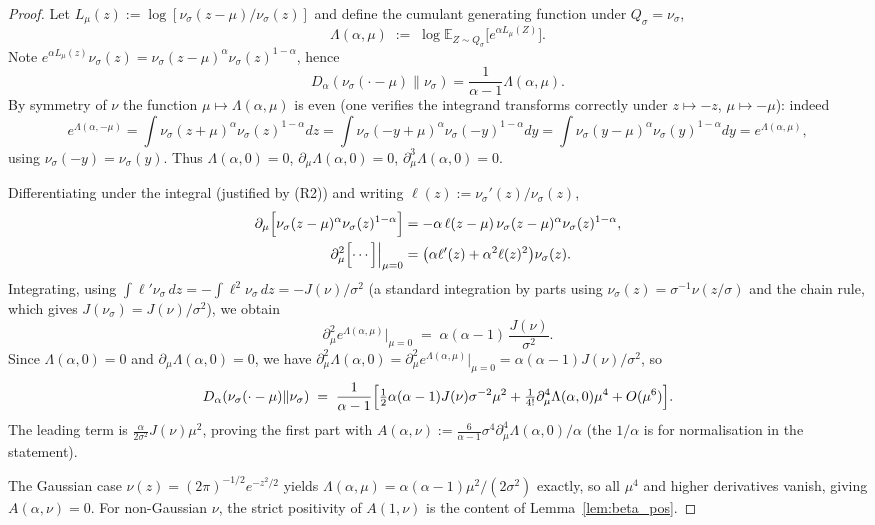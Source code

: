 \documentclass[11pt]{article}
\theoremstyle{definition}
\newcommand{\E}{\mathbb{E}}
\begin{document}
\begin{proof}
Let $L_\mu(z):=\log[\nu_\sigma(z-\mu)/\nu_\sigma(z)]$ and define the cumulant generating function under $Q_\sigma=\nu_\sigma$,
\[
\Lambda(\alpha,\mu)\;:=\;\log \E_{Z\sim Q_\sigma}\bigl[e^{\alpha L_\mu(Z)}\bigr].
\]
Note $e^{\alpha L_\mu(z)}\nu_\sigma(z)=\nu_\sigma(z-\mu)^\alpha\nu_\sigma(z)^{1-\alpha}$, hence
\[
D_\alpha(\nu_\sigma(\cdot-\mu)\|\nu_\sigma)=\frac{1}{\alpha-1}\Lambda(\alpha,\mu).
\]
By symmetry of $\nu$ the function $\mu\mapsto \Lambda(\alpha,\mu)$ is even (one verifies the integrand transforms correctly under $z\mapsto -z$, $\mu\mapsto -\mu$): indeed
\[
e^{\Lambda(\alpha,-\mu)}=\!\int\!\nu_\sigma(z+\mu)^\alpha\nu_\sigma(z)^{1-\alpha}dz=\!\int\!\nu_\sigma(-y+\mu)^\alpha\nu_\sigma(-y)^{1-\alpha}dy=\!\int\!\nu_\sigma(y-\mu)^\alpha\nu_\sigma(y)^{1-\alpha}dy=e^{\Lambda(\alpha,\mu)},
\]
using $\nu_\sigma(-y)=\nu_\sigma(y)$. Thus $\Lambda(\alpha,0)=0$, $\partial_\mu\Lambda(\alpha,0)=0$, $\partial_\mu^3\Lambda(\alpha,0)=0$.

Differentiating under the integral (justified by (R2)) and writing $\ell(z):=\nu_\sigma'(z)/\nu_\sigma(z)$,
\begin{align*}
\partial_\mu\Bigl[\nu_\sigma(z-\mu)^\alpha\nu_\sigma(z)^{1-\alpha}\Bigr]&=-\alpha\,\ell(z-\mu)\,\nu_\sigma(z-\mu)^\alpha\nu_\sigma(z)^{1-\alpha},\\
\partial_\mu^2\Bigl[\cdots\Bigr]\Big|_{\mu=0}&=\bigl(\alpha\ell'(z)+\alpha^2\ell(z)^2\bigr)\nu_\sigma(z).
\end{align*}
Integrating, using $\int\ell'\nu_\sigma\,dz=-\int\ell^2\nu_\sigma\,dz=-J(\nu)/\sigma^2$ (a standard integration by parts using $\nu_\sigma(z)=\sigma^{-1}\nu(z/\sigma)$ and the chain rule, which gives $J(\nu_\sigma)=J(\nu)/\sigma^2$), we obtain
\[
\partial_\mu^2 e^{\Lambda(\alpha,\mu)}\big|_{\mu=0}\;=\;\alpha(\alpha-1)\,\frac{J(\nu)}{\sigma^2}.
\]
Since $\Lambda(\alpha,0)=0$ and $\partial_\mu\Lambda(\alpha,0)=0$, we have $\partial_\mu^2\Lambda(\alpha,0)=\partial_\mu^2 e^{\Lambda(\alpha,\mu)}|_{\mu=0}=\alpha(\alpha-1)J(\nu)/\sigma^2$, so
\[
D_\alpha(\nu_\sigma(\cdot-\mu)\|\nu_\sigma)\;=\;\frac{1}{\alpha-1}\Bigl[\tfrac12\alpha(\alpha-1)J(\nu)\sigma^{-2}\mu^2+\tfrac{1}{4!}\partial_\mu^4\Lambda(\alpha,0)\mu^4+O(\mu^6)\Bigr].
\]
The leading term is $\frac{\alpha}{2\sigma^2}J(\nu)\mu^2$, proving the first part with $A(\alpha,\nu):=\frac{6}{\alpha-1}\sigma^4\partial_\mu^4\Lambda(\alpha,0)/\alpha$ (the $1/\alpha$ is for normalisation in the statement).

The Gaussian case $\nu(z)=(2\pi)^{-1/2}e^{-z^2/2}$ yields $\Lambda(\alpha,\mu)=\alpha(\alpha-1)\mu^2/(2\sigma^2)$ exactly, so all $\mu^4$ and higher derivatives vanish, giving $A(\alpha,\nu)=0$. For non-Gaussian $\nu$, the strict positivity of $A(1,\nu)$ is the content of Lemma~\ref{lem:beta_pos}.
\end{proof}
\end{document}
